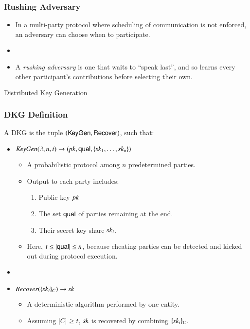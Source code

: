 \documentclass[hyperref={pdfpagelabels=true},table,dvipsnames,14pt,aspectratio=169]{beamer}
\begin{document}
\begin{frame}
  \frametitle{Rushing Adversary}

  \begin{itemize}
    \item<1-> In a multi-party protocol where scheduling of communication is not enforced, an adversary can choose when to participate.
    \item[]
    \item<2-> A \emph{rushing adversary} is one that waits to ``speak last'', and so learns every other participant's contributions before selecting their own.
  \end{itemize}
\end{frame}

\begin{frame}
  \huge
  \centering
  Distributed Key Generation
\end{frame}

\begin{frame}
  \frametitle{DKG Definition}

  A DKG is the tuple $(\mathsf{KeyGen}, \mathsf{Recover})$, such that:

  \begin{itemize}
    \item<2-> $\mathit{KeyGen}(\lambda, n, t) \rightarrow ( \mathit{pk}, \mathsf{qual}, \{\mathit{sk}_1, \ldots, \mathit{sk}_n \} )$
    \begin{itemize}
      \item<3-> A probabilistic protocol among $n$ predetermined parties.
      \item<4-> Output to each party includes:
    \begin{enumerate}
      \item<5->[1.] Public key $\mathit{pk}$
      \item<6->[2.] The set $\mathsf{qual}$ of parties remaining at the end.
      \item<7->[3.] Their secret key share $\mathit{sk}_i$.
    \end{enumerate}

    \item<8->[2.] Here, $t \leq \lvert \mathsf{qual} \rvert \leq n$, because cheating parties can be detected and kicked out during protocol execution.
    \end{itemize}
    \item[]
    \item<8-> $\mathit{Recover}(\{ \mathit{sk}_i \}_C) \rightarrow \mathit{sk}$
    \begin{itemize}
      \item<9-> A deterministic algorithm performed by one entity.
      \item<10-> Assuming $\lvert C \rvert \geq t$, $\mathit{sk}$ is recovered by combining $\{ \mathit{sk}_i \}_C$.
    \end{itemize}
  \end{itemize}
\end{frame}
\end{document}
